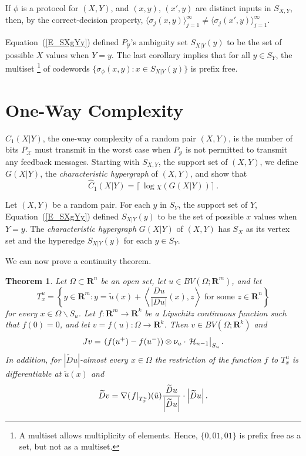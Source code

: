 \documentclass{article}
\newtheorem{thm}{Theorem}[section]
\theoremstyle{definition}
\theoremstyle{remark}
\newcommand{\st}{\sigma}
\newcommand{\XcY}{{(X,Y)}}
\newcommand{\SX}{{S_X}}
\newcommand{\SY}{{S_Y}}
\newcommand{\SXY}{{S_{X,Y}}}
\newcommand{\SXgYy}{{S_{X|Y}(y)}}
\newcommand{\Cw}[1]{{\hat C_#1(X|Y)}}
\newcommand{\G}{{G(X|Y)}}
\newcommand{\PY}{{P_{\mathcal{Y}}}}
\newcommand{\X}{\mathcal{X}}
\newcommand{\wt}{\widetilde}
\newcommand{\eval}[2][\right]{\relax
  \ifx#1\right\relax \left.\fi#2#1\rvert}
\newcommand{\envert}[1]{\left\lvert#1\right\rvert}
\let\abs=\envert
\begin{document}
If $\phi$ is a protocol for $(X,Y)$, and $(x,y)$, $(x',y)$ are distinct
inputs in $\SXY$, then, by the correct-decision property,
$\langle\st_j(x,y)\rangle_{j=1}^\infty\ne\langle
\st_j(x',y)\rangle_{j=1}^\infty$.

Equation~(\ref{E_SXgYy}) defined $\PY$'s ambiguity set $\SXgYy$
to be the set of possible $X$ values when $Y=y$.
The last corollary implies that for all $y\in\SY$,
the multiset%
\footnote{A multiset allows multiplicity of elements.
Hence, $\{0,01,01\}$ is prefix free as a set, but not as a multiset.}
of codewords $\{\st_\phi(x,y):x\in\SXgYy\}$ is prefix free.

\section{One-Way Complexity}
\label{S_Cp1}

$\Cw1$, the one-way complexity of a random pair $\XcY$,
is the number of bits $P_{\X}$ must transmit in the worst case
when $\PY$ is not permitted to transmit any feedback messages.
Starting with $\SXY$, the support set of $\XcY$, we define $\G$,
the \textit{characteristic hypergraph} of $\XcY$, and show that
\[
\Cw1=\lceil\,\log\chi(\G)\rceil\ .
\]

Let $\XcY$ be a random pair. For each $y$ in $\SY$, the support set of
$Y$, Equation~(\ref{E_SXgYy}) defined $\SXgYy$ to be the set of possible
$x$ values when $Y=y$. The \textit{characteristic hypergraph} $\G$ of
$\XcY$ has $\SX$ as its vertex set and the hyperedge $\SXgYy$ for each
$y\in\SY$.


We can now prove a continuity theorem.
\begin{thm}\label{t:conl}
Let $\Omega \subset\mathbf{R}^n$ be an open set, let
$u\in BV(\Omega ;\mathbf{R}^m)$, and let
\begin{equation}\label{quts}
T^u_x=\left\{y\in\mathbf{R}^m:
 y=\tilde u(x)+\left\langle \frac{Du}{\abs{Du}}(x),z
\right\rangle \text{ for some }z\in\mathbf{R}^n\right\}
\end{equation}
for every $x\in\Omega \backslash S_u$. Let $f\colon \mathbf{R}^m\to
\mathbf{R}^k$ be a Lipschitz continuous function such that $f(0)=0$, and
let $v=f(u)\colon \Omega \to \mathbf{R}^k$. Then $v\in BV(\Omega
;\mathbf{R}^k)$ and
\begin{equation}
Jv=\eval{(f(u^+)-f(u^-))\otimes \nu_u\cdot\,
\mathcal{H}_{n-1}}_{S_u}.
\end{equation}
In addition, for $\abs{\wt{D}u}$-almost every $x\in\Omega $ the
restriction of the function $f$ to $T^u_x$ is differentiable at $\tilde
u(x)$ and
\begin{equation}
\wt{D}v=\nabla (\eval{f}_{T^u_x})(\tilde u)
\frac{\wt{D}u}{\abs{\wt{D}u}}\cdot\abs{\wt{D}u}.\end{equation}
\end{thm}
\end{document}
